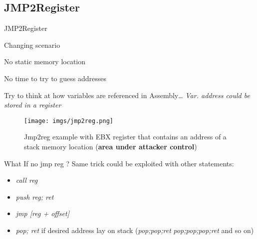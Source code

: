 \subsection{JMP2Register}
\begin{frame}{JMP2Register}

	\begin{block}{Changing scenario}
	\begin{list}{-}{}
	\item No static memory location
	\item No time to try to guess addresses
	\end{list}
	Try to think at how variables are referenced in Assembly\ldots
	\emph{Var. address could be stored in a register}
	\end{block}
	
	\framebreak
	
	\begin{figure}
        \texttt{[image: imgs/jmp2reg.png]}
        \label{fig:jmp2reg}
        \caption{Jmp2reg example with EBX register that contains an address of a stack memory location ({\bf area under attacker control})}
    \end{figure}	
	
	\framebreak
	
	\begin{block}{What If no jmp reg ?}
	Same trick could be exploited with other statements:
	\begin{itemize}
	\item \emph{call reg}
	\item \emph{push reg; ret}
	\item \emph{jmp [reg + offset]}
	\item \emph{pop; ret} if desired address lay on stack (\emph{pop;pop;ret} \emph{pop;pop;pop;ret} and so on)
	\end{itemize}
	\end{block}
	
\end{frame}

